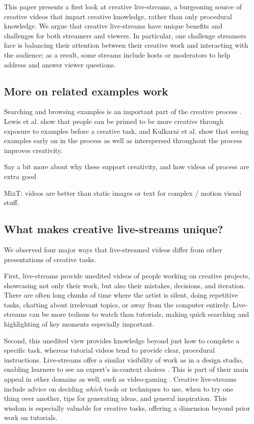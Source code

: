 This paper presents a first look at creative live-streams, a burgeoning source of creative videos that impart creative knowledge, rather than only procedural knowledge. We argue that creative live-streams have unique benefits and challenges for both streamers and viewers. In particular, one challenge streamers face is balancing their attention between their creative work and interacting with the audience; as a result, some streams include hosts or moderators to help address and answer viewer questions. 



\subsection{More on related examples work}
Searching and browsing examples is an important part of the creative process \cite{Shneiderman2002, Shneiderman2007, Greene2002, Herring2009, Muller-Wienbergen2011, Bawden1986}. Lewis et al. \cite{Lewis2011} show that people can be primed to be more creative through exposure to examples before a creative task, and Kulkarni et al. \cite{Kulkarni} show that seeing examples early on in the process as well as interspersed throughout the process improves creativity.

Say a bit more about why these support creativity, and how videos of process are extra good

MixT: videos are better than static images or text for complex / motion visual stuff.

\subsection{What makes creative live-streams unique?}
We observed four major ways that live-streamed videos differ from other presentations of creative tasks.

First, live-streams provide unedited videos of people working on creative projects, showcasing not only their work, but also their mistakes, decisions, and iteration. There are often long chunks of time where the artist is silent, doing repetitive tasks, chatting about irrelevant topics, or away from the computer entirely. Live-streams can be more tedious to watch than tutorials, making quick searching and highlighting of key moments especially important. 

Second, this unedited view provides knowledge beyond just how to complete a specific task, whereas tutorial videos tend to provide clear, procedural instructions. Live-streams offer a similar visibility of work as in a design studio, enabling learners to see an expert's in-context choices \cite{Schon1985}. This is part of their main appeal in other domains as well, such as video-gaming \cite{Sjoblom2017}. Creative live-streams include advice on deciding \textit{which} tools or techniques to use, when to try one thing over another, tips for generating ideas, and general inspiration. This wisdom is especially valuable for creative tasks, offering a dimension beyond prior work on tutorials.

